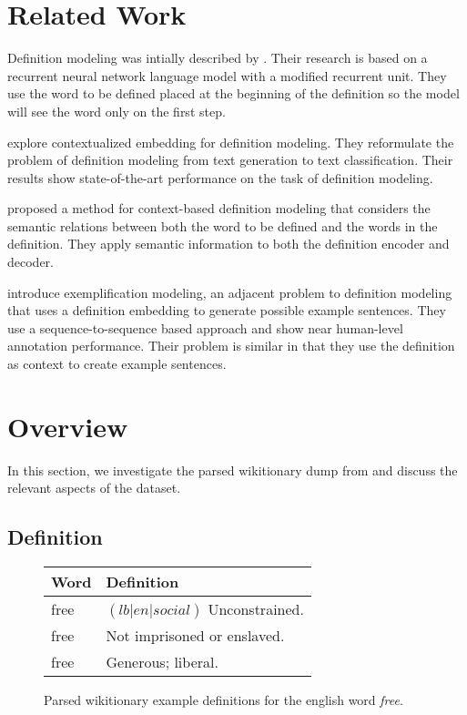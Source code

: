 \documentclass[11pt,a4paper]{article}
\begin{document}
\section{Related Work}

Definition modeling was intially described by \citet{noraset_definition_2016}.
Their research is based on a recurrent neural network language model
\cite{mikolov_recurrent_2010} with a modified recurrent unit. They use the word
to be defined placed at the beginning of the definition so the model will see
the word only on the first step.

\citet{chang_what_2019} explore contextualized embedding for definition
modeling. They reformulate the problem of definition modeling from text
generation to text classification. Their results show state-of-the-art
performance on the task of definition modeling.

\citet{washio_bridging_2019} proposed a method for context-based definition
modeling that considers the semantic relations between both the word to be
defined and the words in the definition. They apply semantic information to both
the definition encoder and decoder.

\citet{barba_exemplification_2021} introduce exemplification modeling, an
adjacent problem to definition modeling that uses a definition embedding to
generate possible example sentences. They use a sequence-to-sequence based
approach and show near human-level annotation performance. Their problem is
similar in that they use the definition as context to create example sentences.

\section{Overview}
In this section, we investigate the parsed wikitionary dump from
\citet{wu_computational_2020} and discuss the relevant aspects of the
dataset.

\subsection{Definition}

\begin{figure}[h]
  \begin{tabular}{|l|l|}
    \hline
    \textbf{Word} & \textbf{Definition}             \\
    \hline\hline
    free          & $(lb|en|social)$ Unconstrained. \\
    free          & Not imprisoned or enslaved.     \\
    free          & Generous; liberal.              \\
    \hline
  \end{tabular}
  \caption{Parsed wikitionary example definitions for the english word
    \textit{free}.}
  \label{fig:wiktionary_definitions}
\end{figure}
\end{document}
